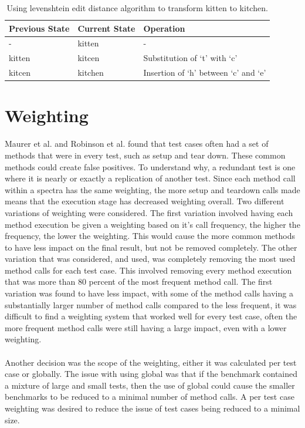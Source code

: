 \begin{table}[]
\centering

\begin{tabular}{|l|l|l|}
\hline
{\bf Previous State} & {\bf Current State} & {\bf Operation}                      \\ \hline
-                    & kitten              & -                                    \\ \hline
kitten               & kitcen              & Substitution of `t' with `c'         \\ \hline
kitcen               & kitchen             & Insertion of `h' between `c' and `e' \\ \hline
\end{tabular}
\caption{Using levenshtein edit distance algorithm to transform kitten to kitchen.}
\label{levenTable}
\end{table}

\section{Weighting}
Maurer et al. \cite{koochakzadeh2009test} and Robinson et al. \cite{li2008static} found that test cases often had a set of methods that were in every test, such as setup and tear down. These common methods could create false positives. To understand why, a redundant test is one where it is nearly or exactly a replication of another test. Since each method call within a spectra has the same weighting, the more setup and teardown calls made means that the execution stage has decreased weighting overall. Two different variations of weighting were considered. The first variation involved having each method execution be given a weighting based on it's call frequency, the higher the frequency, the lower the weighting. This would cause the more common methods to have less impact on the final result, but not be removed completely. The other variation that was considered, and used, was completely removing the most used method calls for each test case. This involved removing every method execution that was more than 80 percent of the most frequent method call. The first variation was found to have less impact, with some of the method calls having a substantially larger number of method calls compared to the less frequent, it was difficult to find a weighting system that worked well for every test case, often the more frequent method calls were still having a large impact, even with a lower weighting.
\paragraph{}
Another decision was the scope of the weighting, either it was calculated per test case or globally. The issue with using global was that if the benchmark contained a mixture of large and small tests, then the use of global could cause the smaller benchmarks to be reduced to a minimal number of method calls. A per test case weighting was desired to reduce the issue of test cases being reduced to a minimal size.
